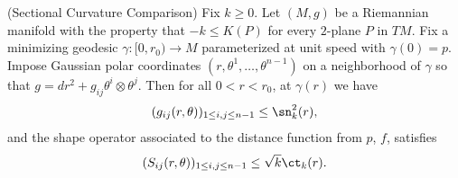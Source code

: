 \begin{theorem}
\label{thm:sectional-curvature-comparison}
\label{SCC}
\leanok
(Sectional Curvature Comparison) Fix $k\ge 0$. Let $(M, g)$ be a
Riemannian manifold with the property that $-k \leq K(P)$ for every
$2$-plane $P$ in $TM$. Fix a minimizing geodesic $\gamma\colon
[0,r_0)\to M$ parameterized at unit speed with $\gamma(0)=p$. Impose
Gaussian polar coordinates $(r,\theta^1,\ldots,\theta^{n-1})$ on a
neighborhood of $\gamma$ so that $g=dr^2+g_{ij}\theta^i\otimes
\theta^j$. Then for all $0<r<r_0$, at $\gamma(r)$ we have
$$ (g_{ij}(r,\theta))_{1 \leq
i,j \leq n-1} \leq \sn_{k}^{2}(r),$$ and the shape operator
associated to  the distance function from $p$, $f$, satisfies
$$(S_{ij}(r,\theta))_{1 \leq i,j \leq n-1} \leq \sqrt{k}\ct_{k}(r).$$
\end{theorem}

